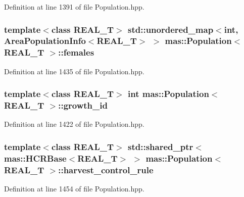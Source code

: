 Definition at line 1391 of file Population.\-hpp.

\hypertarget{classmas_1_1_population_adeeb5c8b2056ea2bc21d7d57ec700ae5}{
\subsubsection[{females}]{\setlength{\rightskip}{0pt plus 5cm}template$<$class R\-E\-A\-L\-\_\-\-T$>$ std\-::unordered\-\_\-map$<$int, {\bf Area\-Population\-Info}$<$R\-E\-A\-L\-\_\-\-T$>$ $>$ {\bf mas\-::\-Population}$<$ R\-E\-A\-L\-\_\-\-T $>$\-::females}}\label{classmas_1_1_population_adeeb5c8b2056ea2bc21d7d57ec700ae5}


Definition at line 1435 of file Population.\-hpp.

\hypertarget{classmas_1_1_population_a2720b3c93f0fc25a600dd37becebd3d7}{
\subsubsection[{growth\-\_\-id}]{\setlength{\rightskip}{0pt plus 5cm}template$<$class R\-E\-A\-L\-\_\-\-T$>$ int {\bf mas\-::\-Population}$<$ R\-E\-A\-L\-\_\-\-T $>$\-::growth\-\_\-id}}\label{classmas_1_1_population_a2720b3c93f0fc25a600dd37becebd3d7}


Definition at line 1422 of file Population.\-hpp.

\hypertarget{classmas_1_1_population_a161064be0d713a6a0481f297f84f5729}{
\subsubsection[{harvest\-\_\-control\-\_\-rule}]{\setlength{\rightskip}{0pt plus 5cm}template$<$class R\-E\-A\-L\-\_\-\-T$>$ std\-::shared\-\_\-ptr$<${\bf mas\-::\-H\-C\-R\-Base}$<$R\-E\-A\-L\-\_\-\-T$>$ $>$ {\bf mas\-::\-Population}$<$ R\-E\-A\-L\-\_\-\-T $>$\-::harvest\-\_\-control\-\_\-rule}}\label{classmas_1_1_population_a161064be0d713a6a0481f297f84f5729}


Definition at line 1454 of file Population.\-hpp.

